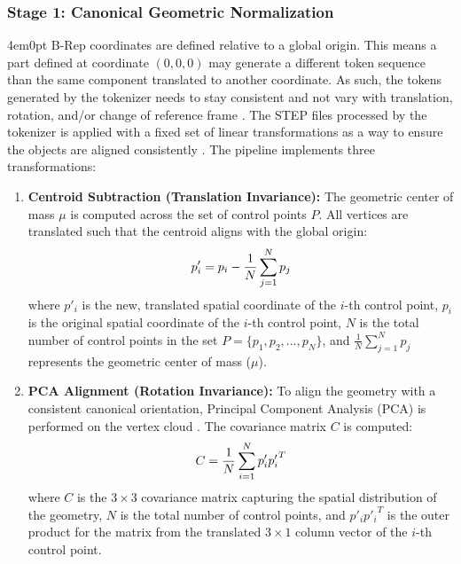 		\subsubsection{Stage 1: Canonical Geometric Normalization}
			\begin{indentedblock}{4em}{0pt}
				B-Rep coordinates are defined relative to a global origin. This means a part defined at coordinate $(0,0,0)$ may generate a different token sequence than the same component translated to another coordinate. As such, the tokens generated by the tokenizer needs to stay consistent and not vary with translation, rotation, and/or change of reference frame \parencites{medical_imaging_li}{rotational_invariance_muaz}. The STEP files processed by the tokenizer is applied with a fixed set of linear transformations as a way to ensure the objects are aligned consistently \parencite{deepcad_wu}. The pipeline implements three transformations:
				
				\begin{enumerate}
					\item \textbf{Centroid Subtraction (Translation Invariance):} The geometric center of mass $\mu$ is computed across the set of control points $P$. All vertices are translated such that the centroid aligns with the global origin:
					\begin{equation}
						p'_i = p_i - \frac{1}{N}\sum_{j=1}^{N} p_j
						\addformula{Centroid Transformation}
					\end{equation}
					where $p'_i$ is the new, translated spatial coordinate of the $i$-th control point, $p_i$ is the original spatial coordinate of the $i$-th control point, $N$ is the total number of control points in the set $P = \{p_1, p_2, ..., p_N\}$, and $\frac{1}{N}\sum_{j=1}^{N} p_j$ represents the geometric center of mass ($\mu$).
					
					\item \textbf{PCA Alignment (Rotation Invariance):} To align the geometry with a consistent canonical orientation, Principal Component Analysis (PCA) is performed on the vertex cloud \parencite{alignment_chaouch}. The covariance matrix $C$ is computed:
					\begin{equation}
						C = \frac{1}{N} \sum_{i=1}^{N} p'_i {p'_i}^T
						\addformula{PCA Alignment}
					\end{equation}
					where $C$ is the $3 \times 3$ covariance matrix capturing the spatial distribution of the geometry, $N$ is the total number of control points, and $p'_i {p'_i}^T$ is the outer product for the matrix from the translated $3 \times 1$ column vector of the $i$-th control point.
					

\end{enumerate}
\end{indentedblock}
